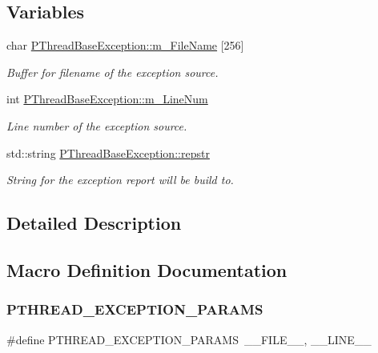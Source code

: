 \subsection*{Variables}
\begin{DoxyCompactItemize}
\item 
char \hyperlink{group__EXCEPT__GROUP_gace215cb27c8b35eae74d51e9a18f5bfa}{P\+Thread\+Base\+Exception\+::m\+\_\+\+File\+Name} \mbox{[}256\mbox{]}
\begin{DoxyCompactList}\small\item\em Buffer for filename of the exception source. \end{DoxyCompactList}\item 
int \hyperlink{group__EXCEPT__GROUP_ga14fc21c1387d9427ec22d7712c509517}{P\+Thread\+Base\+Exception\+::m\+\_\+\+Line\+Num}
\begin{DoxyCompactList}\small\item\em Line number of the exception source. \end{DoxyCompactList}\item 
std\+::string \hyperlink{group__EXCEPT__GROUP_ga13ce50b63f814e93fc17c484fc28fcd6}{P\+Thread\+Base\+Exception\+::repstr}
\begin{DoxyCompactList}\small\item\em String for the exception report will be build to. \end{DoxyCompactList}\end{DoxyCompactItemize}


\subsection{Detailed Description}


\subsection{Macro Definition Documentation}
\mbox{\label{group__EXCEPT__GROUP_gaf6a9cbd32371e5892a6b4190928651dd}} 
\subsubsection{\texorpdfstring{P\+T\+H\+R\+E\+A\+D\+\_\+\+E\+X\+C\+E\+P\+T\+I\+O\+N\+\_\+\+P\+A\+R\+A\+MS}{PTHREAD\_EXCEPTION\_PARAMS}}
{\footnotesize\ttfamily \#define P\+T\+H\+R\+E\+A\+D\+\_\+\+E\+X\+C\+E\+P\+T\+I\+O\+N\+\_\+\+P\+A\+R\+A\+MS~\+\_\+\+\_\+\+F\+I\+L\+E\+\_\+\+\_\+, \+\_\+\+\_\+\+L\+I\+N\+E\+\_\+\+\_\+}




